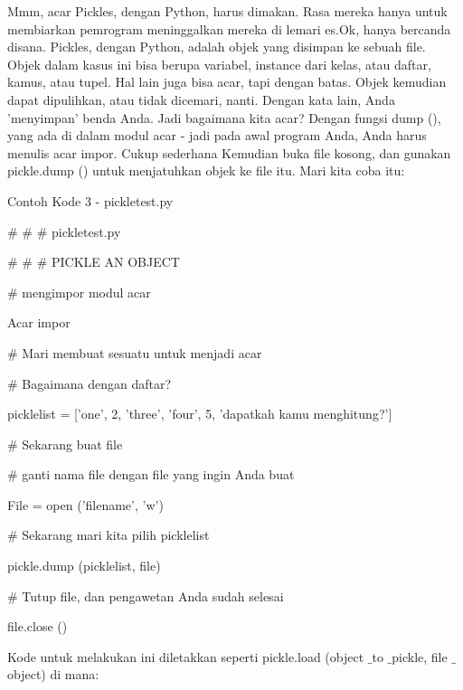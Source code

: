 Mmm, acar Pickles, dengan Python, harus dimakan. Rasa mereka hanya untuk membiarkan pemrogram meninggalkan mereka di lemari es.Ok, hanya bercanda disana. Pickles, dengan Python, adalah objek yang disimpan ke sebuah file. Objek dalam kasus ini bisa berupa variabel, instance dari kelas, atau daftar, kamus, atau tupel. Hal lain juga bisa acar, tapi dengan batas. Objek kemudian dapat dipulihkan, atau tidak dicemari, nanti. Dengan kata lain, Anda 'menyimpan' benda Anda. Jadi bagaimana kita acar? Dengan fungsi dump (), yang ada di dalam modul acar - jadi pada awal program Anda, Anda harus menulis acar impor. Cukup sederhana Kemudian buka file kosong, dan gunakan pickle.dump () untuk menjatuhkan objek ke file itu. Mari kita coba itu: \par
\noindent 
Contoh Kode 3 - pickletest.py \par
\vspace{12pt}
\noindent 
 $  \#  $ $  \#  $ $  \#  $ pickletest.py \par
\noindent 
 $  \#  $ $  \#  $ $  \#  $ PICKLE AN OBJECT \par
\vspace{12pt}
\noindent 
 $  \#  $ mengimpor modul acar \par
\noindent 
Acar impor \par
\vspace{12pt}
\noindent 
 $  \#  $ Mari membuat sesuatu untuk menjadi acar \par
\noindent 
 $  \#  $ Bagaimana dengan daftar? \par
\noindent 
picklelist = ['one', 2, 'three', 'four', 5, 'dapatkah kamu menghitung?'] \par
\vspace{12pt}
\noindent 
 $  \#  $ Sekarang buat file \par
\noindent 
 $  \#  $ ganti nama file dengan file yang ingin Anda buat \par
\noindent 
File = open ('filename', 'w') \par
\vspace{12pt}
\noindent 
 $  \#  $ Sekarang mari kita pilih picklelist \par
\noindent 
pickle.dump (picklelist, file) \par
\vspace{12pt}
\noindent 
 $  \#  $ Tutup file, dan pengawetan Anda sudah selesai \par
\noindent 
file.close () \par
\vspace{12pt}
\noindent 
Kode untuk melakukan ini diletakkan seperti pickle.load (object $  \_  $to $  \_  $pickle, file $  \_  $object) di mana: \par
